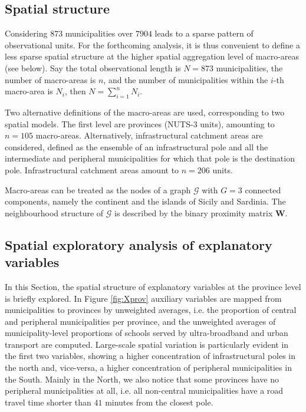 \documentclass{book}
\begin{document}
\subsection{Spatial structure} \label{par:graph}
Considering $873$ municipalities over $7904$ leads to a sparse pattern of observational units. For the forthcoming analysis, it is thus convenient to define a less sparse spatial structure at the higher spatial aggregation level of macro-areas (see below). Say the total observational length is $N = 873$ municipalities, the number of macro-areas is $n$, and the number of municipalities within the $i$-th macro-area is $N_i$, then $N = \sum_{i=1}^{n} N_i$.

Two alternative definitions of the macro-areas are used, corresponding to two spatial models. The first level are provinces (NUTS-3 units), amounting to $n = 105$ macro-areas. Alternatively, infrastructural catchment areas are considered, defined as the ensemble of an infrastructural pole and all the intermediate and peripheral municipalities for which that pole is the destination pole. Infrastructural catchment areas amount to $n = 206$ units.

Macro-areas can be treated as the nodes of a graph $\mathcal{G}$ with $G = 3$ connected components, namely the continent and the islands of Sicily and Sardinia. The neighbourhood structure of $\mathcal{G}$ is described by the binary proximity matrix $\mathbf{W}$.

\subsection{Spatial exploratory analysis of explanatory variables} \label{par:X}

In this Section, the spatial structure of explanatory variables at the province level is briefly explored.
In Figure \ref{fig:Xprov} auxiliary variables are mapped from municipalities to provinces by unweighted averages, i.e. the proportion of central and peripheral municipalities per province, and the unweighted averages of municipality-level proportions of schools served by ultra-broadband and urban transport are computed. Large-scale spatial variation is particularly evident in the first two variables, showing a higher concentration of infrastructural poles in the north and, vice-versa, a higher concentration of peripheral municipalities in the South. Mainly in the North, we also notice that some provinces have no peripheral municipalities at all, i.e. all non-central municipalities have a road travel time shorter than $41$ minutes \citep{InnerAreas} from the closest pole.
\end{document}
